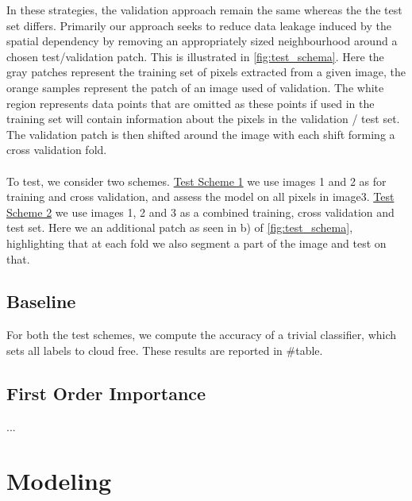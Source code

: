 \documentclass[11pt, letterpaper, journal]{IEEEtran}
\begin{document}
In these strategies, the validation approach remain the same whereas the the test set differs. Primarily our approach seeks to reduce data leakage induced by the spatial dependency by removing an appropriately sized neighbourhood around a chosen test/validation patch. This is illustrated in \ref{fig:test_schema}. Here the gray patches represent the training set of pixels extracted from a given image, the orange samples represent the patch of an image used of validation. The white region represents data points that are omitted as these points if used in the training set will contain information about the pixels in the validation / test set. The validation patch is then shifted around the image with each shift forming a cross validation fold. 
\\
\\
To test, we consider two schemes. \underline{Test Scheme 1} we use images 1 and 2 as for training and cross validation, and assess the model on all pixels in image3. \underline{Test Scheme 2} we use images 1, 2 and 3 as a combined training, cross validation and test set. Here we an additional patch as seen in b) of \ref{fig:test_schema}, highlighting that at each fold we also segment a part of the image and test on that. 
\subsection{Baseline}
For both the test schemes, we compute the accuracy of a trivial classifier, which sets all labels to cloud free. These results are reported in #table.

\subsection{First Order Importance}

...


\section{Modeling}
\end{document}
